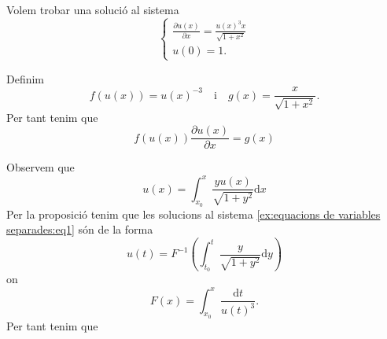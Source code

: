 \documentclass[../Apunts.tex]{subfiles}
\begin{document}
	\begin{example}
		\label{ex:equacions de variables separades}
		Volem trobar una solució al sistema
		\begin{equation}
			\label{ex:equacions de variables separades:eq1}
			\begin{cases*}
				\displaystyle \frac{\partial u(x)}{\partial x}=\frac{u(x)^{3}x}{\sqrt{1+x^{2}}} \\
				u(0)=1.
			\end{cases*}
		\end{equation}
		\begin{solution}
			Definim
			\[f(u(x))=u(x)^{-3}\quad\text{i}\quad g(x)=\frac{x}{\sqrt{1+x^{2}}}.\]
			Per tant tenim que
			\[f(u(x))\frac{\partial u(x)}{\partial x}=g(x)\]
			
			Observem que
			\[u(x)=\int_{x_{0}}^{x}\frac{yu(x)}{\sqrt{1+y^{2}}}\text{d}x\]
			Per la proposició  tenim que les solucions al sistema \eqref{ex:equacions de variables separades:eq1} són de la forma
			\[u(t)=F^{-1}\left(\int_{t_{0}}^ {t}\frac{y}{\sqrt{1+y^{2}}}\text{d}y\right)\]
			on
			\[F(x)=\int_{x_{0}}^{x}\frac{\text{d}t}{u(t)^{3}}.\]
			Per tant tenim que
			\[\]
		\end{solution}
	\end{example}
\end{document}
